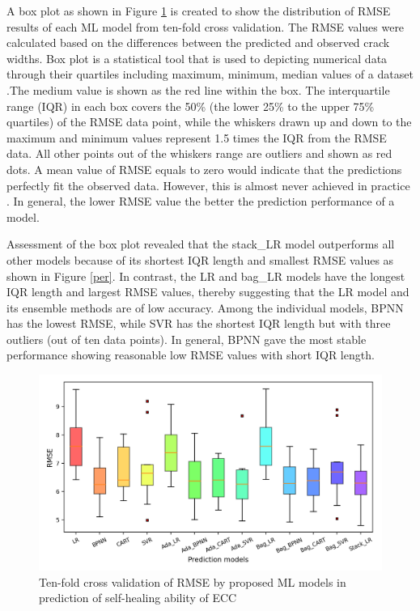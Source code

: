 \documentclass[11pt]{article}
\begin{document}
	
	A box plot as shown in Figure \ref{bar} is created to show the distribution of RMSE results of each ML model from ten-fold cross validation. The RMSE values were calculated based on the differences between the predicted and observed crack widths. Box plot is a statistical tool that is used to depicting numerical data through their quartiles including maximum, minimum, median values of a dataset \cite{taffese2015caprm,olalusi2020machine}.The medium value is shown as the red line within the box. The interquartile range (IQR) in each box covers the 50\% (the lower 25\% to the upper 75\% quartiles) of the RMSE data point, while the whiskers drawn up and down to the maximum and minimum values represent 1.5 times the IQR from the RMSE data. All other points out of the whiskers range are outliers and shown as red dots. A mean value of RMSE equals to zero would indicate that the predictions perfectly fit the observed data. However, this is almost never achieved in practice \cite{wikiRMSE}. In general, the lower RMSE value the  better the prediction performance of a model. 
   	
	
	Assessment of the box plot revealed that the stack\_LR model outperforms all other models because of its shortest IQR length and smallest RMSE values as shown in Figure \ref{per}. In contrast, the LR and bag\_LR models have the longest IQR length and largest RMSE values, thereby suggesting that the LR model and its ensemble methods are of low accuracy. Among the individual models, BPNN has the lowest RMSE, while SVR has the shortest IQR length but with three outliers (out of ten data points). In general, BPNN gave the most stable performance showing reasonable low RMSE values with short IQR length. 
	
	
	
	\begin{figure}[!h]
		\centering
		\includegraphics[width=\textwidth]{boxRMSE.png}
		\caption{Ten-fold cross validation of RMSE by proposed ML models in prediction of self-healing ability of ECC}
		\label{bar}
	\end{figure}
	
\end{document}

